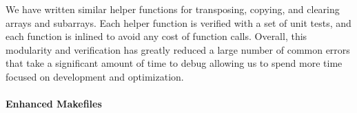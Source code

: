 We have written similar helper functions for transposing, copying, and clearing
arrays and subarrays. Each helper function is verified with a set of unit
tests, and each function is inlined to avoid any cost of function calls.
Overall, this modularity and verification has greatly reduced a large number of
common errors that take a significant amount of time to debug allowing us to
spend more time focused on development and optimization.

\paragraph{Enhanced Makefiles}
